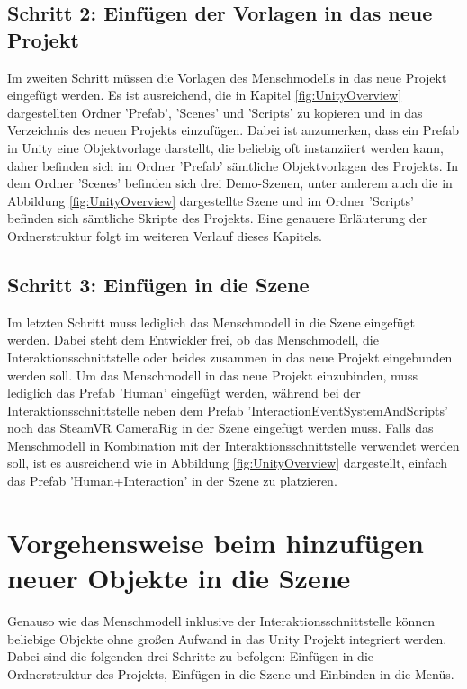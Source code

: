 \subsection{Schritt 2: Einfügen der Vorlagen in das neue Projekt}
Im zweiten Schritt müssen die Vorlagen des Menschmodells in das neue Projekt eingefügt werden. Es ist ausreichend, die in Kapitel \ref{fig:UnityOverview} dargestellten Ordner 'Prefab', 'Scenes' und 'Scripts' zu kopieren und in das Verzeichnis des neuen Projekts einzufügen. Dabei ist anzumerken, dass ein Prefab in Unity eine Objektvorlage darstellt, die beliebig oft instanziiert werden kann, daher befinden sich im Ordner 'Prefab' sämtliche Objektvorlagen des Projekts. In dem Ordner 'Scenes' befinden sich drei Demo-Szenen, unter anderem auch die in Abbildung \ref{fig:UnityOverview} dargestellte Szene und im Ordner 'Scripts' befinden sich sämtliche Skripte des Projekts. Eine genauere Erläuterung der Ordnerstruktur folgt im weiteren Verlauf dieses Kapitels.

\subsection{Schritt 3: Einfügen in die Szene}
Im letzten Schritt muss lediglich das Menschmodell in die Szene eingefügt werden. Dabei steht dem Entwickler frei, ob das Menschmodell, die Interaktionsschnittstelle oder beides zusammen in das neue Projekt eingebunden werden soll. Um das Menschmodell in das neue Projekt einzubinden, muss lediglich das Prefab 'Human' eingefügt werden, während bei der Interaktionsschnittstelle neben dem Prefab 'InteractionEventSystemAndScripts' noch das SteamVR CameraRig in der Szene eingefügt werden muss. Falls das Menschmodell in Kombination mit der Interaktionsschnittstelle verwendet werden soll, ist es ausreichend wie in Abbildung \ref{fig:UnityOverview} dargestellt, einfach das Prefab 'Human+Interaction' in der Szene zu platzieren.

\section{Vorgehensweise beim hinzufügen neuer Objekte in die Szene}\label{sec:ObjekteEinbinden}
Genauso wie das Menschmodell inklusive der Interaktionsschnittstelle können beliebige Objekte ohne großen Aufwand in das Unity Projekt integriert werden. Dabei sind die folgenden drei Schritte zu befolgen: Einfügen in die Ordnerstruktur des Projekts, Einfügen in die Szene und Einbinden in die Menüs.

